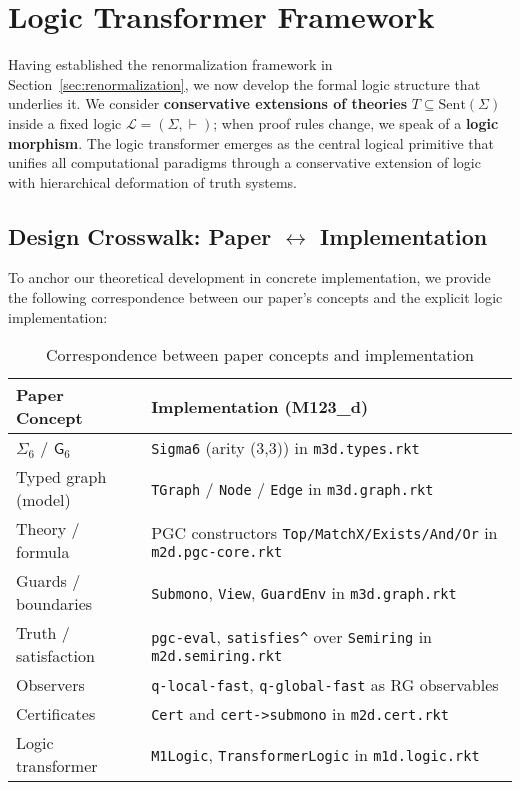 \section{Logic Transformer Framework}
\label{sec:formal-systems}

Having established the renormalization framework in Section~\ref{sec:renormalization}, we now develop the formal logic structure that underlies it. We consider \textbf{conservative extensions of theories} $T\subseteq\mathrm{Sent}(\Sigma)$ inside a fixed logic $\mathcal{L}=(\Sigma,\vdash)$; when proof rules change, we speak of a \textbf{logic morphism}. The logic transformer emerges as the central logical primitive that unifies all computational paradigms through a conservative extension of logic with hierarchical deformation of truth systems.

\subsection{Design Crosswalk: Paper $\leftrightarrow$ Implementation}

To anchor our theoretical development in concrete implementation, we provide the following correspondence between our paper's concepts and the explicit logic implementation:

\begin{table}[h]
\centering
\begin{tabular}{|l|l|}
\hline
\textbf{Paper Concept} & \textbf{Implementation (M123\_d)} \\
\hline
$\Sigma_6$ / $\mathsf{G}_6$ & \texttt{Sigma6} (arity (3,3)) in \texttt{m3d.types.rkt} \\
Typed graph (model) & \texttt{TGraph} / \texttt{Node} / \texttt{Edge} in \texttt{m3d.graph.rkt} \\
Theory / formula & PGC constructors \texttt{Top/MatchX/Exists/And/Or} in \texttt{m2d.pgc-core.rkt} \\
Guards / boundaries & \texttt{Submono}, \texttt{View}, \texttt{GuardEnv} in \texttt{m3d.graph.rkt} \\
Truth / satisfaction & \texttt{pgc-eval}, \texttt{satisfies\^{}} over \texttt{Semiring} in \texttt{m2d.semiring.rkt} \\
Observers & \texttt{q-local-fast}, \texttt{q-global-fast} as RG observables \\
Certificates & \texttt{Cert} and \texttt{cert->submono} in \texttt{m2d.cert.rkt} \\
Logic transformer & \texttt{M1Logic}, \texttt{TransformerLogic} in \texttt{m1d.logic.rkt} \\
\hline
\end{tabular}
\caption{Correspondence between paper concepts and implementation}
\label{tab:design-crosswalk}
\end{table}

